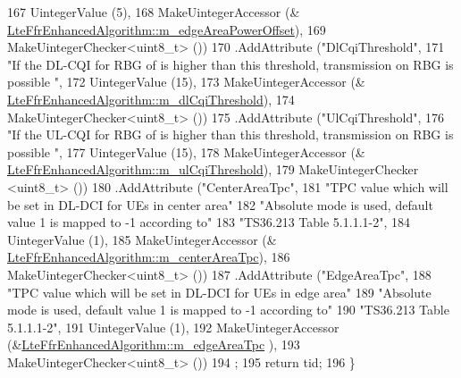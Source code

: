 \begin{DoxyCode}
167                    UintegerValue (5),
168                    MakeUintegerAccessor (&
      \hyperlink{classns3_1_1LteFfrEnhancedAlgorithm_af0271925d69d405352df0ee7255bee71}{LteFfrEnhancedAlgorithm::m\_edgeAreaPowerOffset}),
169                    MakeUintegerChecker<uint8\_t> ())
170     .AddAttribute (\textcolor{stringliteral}{"DlCqiThreshold"},
171                    \textcolor{stringliteral}{"If the DL-CQI for RBG of is higher than this threshold, transmission on RBG is possible
      "},
172                    UintegerValue (15),
173                    MakeUintegerAccessor (&
      \hyperlink{classns3_1_1LteFfrEnhancedAlgorithm_a689079599521cf458db492f362d3c2bb}{LteFfrEnhancedAlgorithm::m\_dlCqiThreshold}),
174                    MakeUintegerChecker<uint8\_t> ())
175     .AddAttribute (\textcolor{stringliteral}{"UlCqiThreshold"},
176                    \textcolor{stringliteral}{"If the UL-CQI for RBG of is higher than this threshold, transmission on RBG is possible
      "},
177                    UintegerValue (15),
178                    MakeUintegerAccessor (&
      \hyperlink{classns3_1_1LteFfrEnhancedAlgorithm_a4d976f3ccd5eb1abf8a8bd8c58847481}{LteFfrEnhancedAlgorithm::m\_ulCqiThreshold}),
179                    MakeUintegerChecker <uint8\_t> ())
180     .AddAttribute (\textcolor{stringliteral}{"CenterAreaTpc"},
181                    \textcolor{stringliteral}{"TPC value which will be set in DL-DCI for UEs in center area"}
182                    \textcolor{stringliteral}{"Absolute mode is used, default value 1 is mapped to -1 according to"}
183                    \textcolor{stringliteral}{"TS36.213 Table 5.1.1.1-2"},
184                    UintegerValue (1),
185                    MakeUintegerAccessor (&
      \hyperlink{classns3_1_1LteFfrEnhancedAlgorithm_a691a9031ef47da59d0bfbf4237b47cd6}{LteFfrEnhancedAlgorithm::m\_centerAreaTpc}),
186                    MakeUintegerChecker<uint8\_t> ())
187     .AddAttribute (\textcolor{stringliteral}{"EdgeAreaTpc"},
188                    \textcolor{stringliteral}{"TPC value which will be set in DL-DCI for UEs in edge area"}
189                    \textcolor{stringliteral}{"Absolute mode is used, default value 1 is mapped to -1 according to"}
190                    \textcolor{stringliteral}{"TS36.213 Table 5.1.1.1-2"},
191                    UintegerValue (1),
192                    MakeUintegerAccessor (&\hyperlink{classns3_1_1LteFfrEnhancedAlgorithm_a7aeabe8a846be02adc93f8e08d5fd6b2}{LteFfrEnhancedAlgorithm::m\_edgeAreaTpc}
      ),
193                    MakeUintegerChecker<uint8\_t> ())
194   ;
195   \textcolor{keywordflow}{return} tid;
196 \}
\end{DoxyCode}


